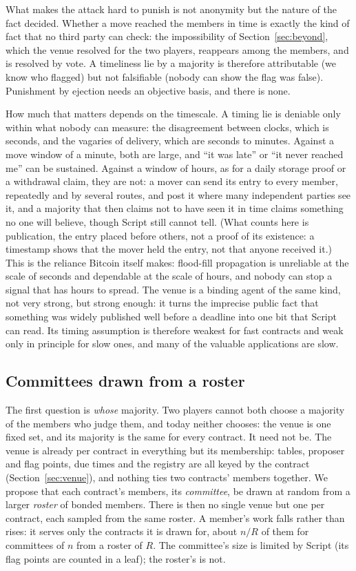 \documentclass[11pt]{article}
\begin{document}
What makes the attack hard to punish is not anonymity but the nature of
the fact decided. Whether a move reached the members in time is exactly
the kind of fact that no third party can check: the impossibility of
Section~\ref{sec:beyond}, which the venue resolved for the two players,
reappears among the members, and is resolved by vote. A timeliness lie
by a majority is therefore attributable (we know who flagged) but not
falsifiable (nobody can show the flag was false). Punishment by ejection
needs an objective basis, and there is none.

How much that matters depends on the timescale. A timing lie is
deniable only within what nobody can measure: the disagreement between
clocks, which is seconds, and the vagaries of delivery, which are
seconds to minutes. Against a move window of a minute, both are large,
and ``it was late'' or ``it never reached me'' can be sustained. Against a
window of hours, as for a daily storage proof or a withdrawal claim,
they are not: a mover can send its entry to every member, repeatedly
and by several routes, and post it where many independent parties see
it, and a majority that then claims not to have seen it in time claims
something no one will believe, though Script still cannot tell. (What
counts here is publication, the entry placed before others, not a proof
of its existence: a timestamp shows that the mover held the entry, not
that anyone received it.) This is the reliance
Bitcoin itself makes: flood-fill propagation is unreliable at the scale
of seconds and dependable at the scale of hours, and nobody can stop a
signal that has hours to spread. The venue is a binding agent of the
same kind, not very strong, but strong enough: it turns the imprecise
public fact that something was widely published well before a deadline
into one bit that Script can read. Its timing assumption is therefore
weakest for fast contracts and weak only in principle for slow ones,
and many of the valuable applications are slow.

\subsection{Committees drawn from a roster}
\label{sec:roster}

The first question is \emph{whose} majority. Two players cannot both
choose a majority of the members who judge them, and today neither
chooses: the venue is one fixed set, and its majority is the same for
every contract. It need not be. The venue is already per contract in
everything but its membership: tables, proposer and flag points, due
times and the registry are all keyed by the contract
(Section~\ref{sec:venue}), and nothing ties two contracts' members
together. We propose that each contract's members, its
\emph{committee}, be drawn at random from a larger \emph{roster} of
bonded members. There is then no single venue but one per contract,
each sampled from the same roster. A member's work falls rather than
rises: it serves only the contracts it is drawn for, about $n/R$ of them
for committees of $n$ from a roster of $R$. The committee's size is
limited by Script (its flag points are counted in a leaf); the roster's
is not.
\end{document}
